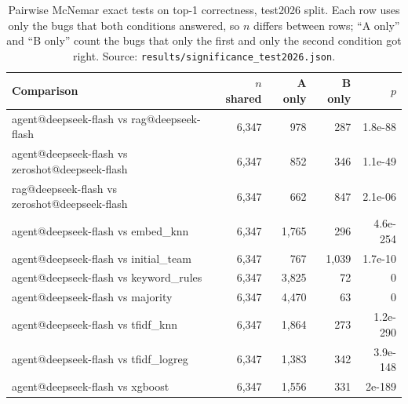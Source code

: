 \begin{table}[t]\centering
\small
\caption{Pairwise McNemar exact tests on top-1 correctness, test2026 split. Each row uses only the bugs that both conditions answered, so $n$ differs between rows; ``A only'' and ``B only'' count the bugs that only the first and only the second condition got right. Source: \texttt{results/significance\_test2026.json}.}
\label{tab:significance-test2026}
\begin{tabular}{lrrrr}
\toprule
Comparison & $n$ shared & A only & B only & $p$ \\
\midrule
agent@deepseek-flash vs rag@deepseek-flash & 6{,}347 & 978 & 287 & 1.8e-88 \\
agent@deepseek-flash vs zeroshot@deepseek-flash & 6{,}347 & 852 & 346 & 1.1e-49 \\
rag@deepseek-flash vs zeroshot@deepseek-flash & 6{,}347 & 662 & 847 & 2.1e-06 \\
agent@deepseek-flash vs embed\_knn & 6{,}347 & 1{,}765 & 296 & 4.6e-254 \\
agent@deepseek-flash vs initial\_team & 6{,}347 & 767 & 1{,}039 & 1.7e-10 \\
agent@deepseek-flash vs keyword\_rules & 6{,}347 & 3{,}825 & 72 & 0 \\
agent@deepseek-flash vs majority & 6{,}347 & 4{,}470 & 63 & 0 \\
agent@deepseek-flash vs tfidf\_knn & 6{,}347 & 1{,}864 & 273 & 1.2e-290 \\
agent@deepseek-flash vs tfidf\_logreg & 6{,}347 & 1{,}383 & 342 & 3.9e-148 \\
agent@deepseek-flash vs xgboost & 6{,}347 & 1{,}556 & 331 & 2e-189 \\
\bottomrule
\end{tabular}
\end{table}
